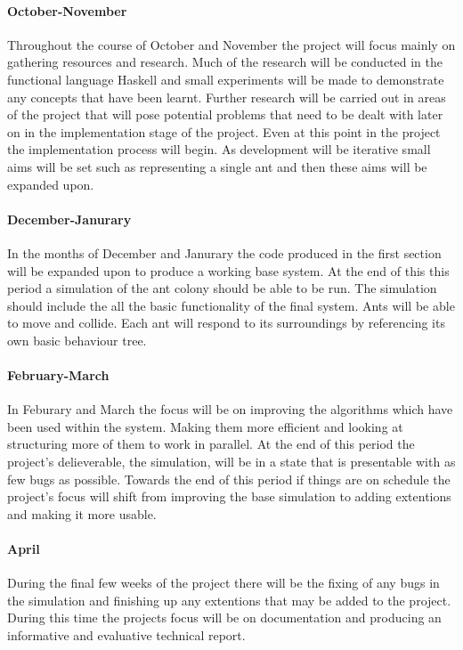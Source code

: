 \documentclass[main.tex]{subfiles}
\begin{document}
\paragraph{October-November}
Throughout the course of October and November the project will focus mainly on gathering resources  and research. Much of the research will be conducted in the functional language Haskell and small experiments will be made to demonstrate any concepts that have been learnt. Further research will be carried out in areas of the project that will pose potential problems that need to be dealt with later on in the implementation stage of the project. Even at this point in the project the implementation process will begin. As development will be iterative small aims will be set such as representing a single ant and then these aims will be expanded upon.

\paragraph{December-Janurary}
In the months of December and Janurary the code produced in the first section will be expanded upon to produce a working base system. At the end of this this period a simulation of the ant colony should be able to be run. The simulation should include the all the basic functionality of the final system. Ants will be able to move and collide. Each ant will respond to its surroundings by referencing its own basic behaviour tree.

\paragraph{February-March}
In Feburary and March the focus will be on improving the algorithms which have been used within the system. Making them more efficient and looking at structuring more of them to work in parallel. At the end of this period the project's delieverable, the simulation, will be in a state that is presentable with as few bugs as possible. Towards the end of this period if things are on schedule the project's focus will shift from improving the base simulation to adding extentions and making it more usable.

\paragraph{April}
During the final few weeks of the project there will be the fixing of any bugs in the simulation and finishing up any extentions that may be added to the project. During this time the projects focus will be on documentation and producing an informative and evaluative technical report.
\end{document}
